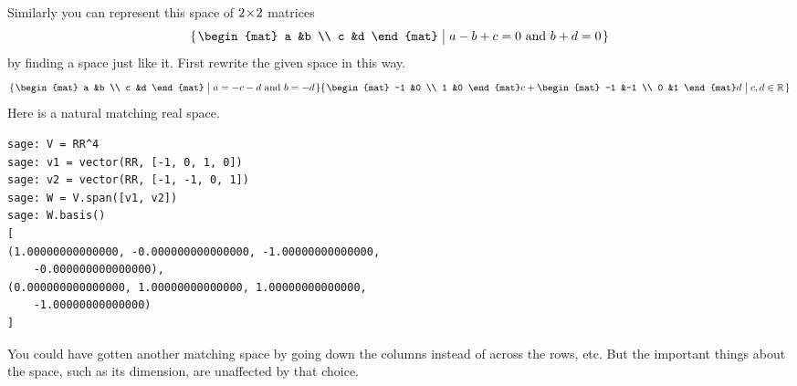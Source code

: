 Similarly you can represent this space of $2 \! \times \! 2$ matrices
\begin{equation*}
  \set{\begin{mat}
         a  &b \\
         c  &d
       \end{mat}\suchthat \text{$a-b+c=0$ and $b+d=0$}}
\end{equation*}
by finding a space just like it.
First rewrite the given space in this way.
\begin{equation*}
  \set{\begin{mat}
         a  &b \\
         c  &d
       \end{mat}\suchthat \text{$a=-c-d$ and $b=-d$}}
  \set{\begin{mat}
         -1  &0 \\
          1  &0
       \end{mat}c
       +
       \begin{mat}
         -1  &-1 \\
          0  &1
       \end{mat}d
       \suchthat c,d\in\Re}
\end{equation*}
Here is a natural matching real space.
\begin{lstlisting}
sage: V = RR^4
sage: v1 = vector(RR, [-1, 0, 1, 0])
sage: v2 = vector(RR, [-1, -1, 0, 1])
sage: W = V.span([v1, v2])
sage: W.basis()
[
(1.00000000000000, -0.000000000000000, -1.00000000000000, 
    -0.000000000000000),
(0.000000000000000, 1.00000000000000, 1.00000000000000, 
    -1.00000000000000)
]  
\end{lstlisting}
You could have gotten another matching space by going down the columns 
instead of across the rows, etc.  
But the important things about the space, such as its dimension, are 
unaffected by that choice.

\endinput


TODO:
